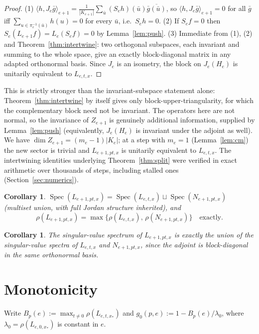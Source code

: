 \documentclass[11pt]{article}
\newtheorem{corollary}[theorem]{Corollary}
\theoremstyle{definition}
\theoremstyle{remark}
\newcommand{\Spec}{\operatorname{Spec}}
\begin{document}
\begin{proof}
(1) $\langle h,J_e\bar g\rangle_{e+1}=\frac{1}{|K_{e+1}|}\sum_{\bar u}(S_eh)(\bar u)\overline{\bar g(\bar u)}$, so $\langle h,J_e\bar g\rangle_{e+1}=0$ for all $\bar g$ iff $\sum_{u\in\pi_e^{-1}(\bar u)}h(u)=0$ for every $\bar u$, i.e.\ $S_eh=0$.
(2) If $S_ef=0$ then $S_e(L_{e+1}f)=L_e(S_ef)=0$ by Lemma~\ref{lem:push}.
(3) Immediate from (1), (2) and Theorem~\ref{thm:intertwine}: two orthogonal subspaces, each invariant and summing to the whole space, give an exactly block-diagonal matrix in any adapted orthonormal basis. Since $J_e$ is an isometry, the block on $J_e(H_e)$ is unitarily equivalent to $L_{e,t,x}$.
\end{proof}

This is strictly stronger than the invariant-subspace statement alone: Theorem~\ref{thm:intertwine} by itself gives only block-upper-triangularity, for which the complementary block need not be invariant. The operators here are not normal, so the invariance of $Z_{e+1}$ is genuinely additional information, supplied by Lemma~\ref{lem:push} (equivalently, $J_e(H_e)$ is invariant under the adjoint as well). We have $\dim Z_{e+1}=(m_e-1)|K_e|$; at a step with $m_e=1$ (Lemma~\ref{lem:cm}) the new sector is trivial and $L_{e+1,pt,x}$ is unitarily equivalent to $L_{e,t,x}$. The intertwining identities underlying Theorem~\ref{thm:split} were verified in exact arithmetic over thousands of steps, including stalled ones (Section~\ref{sec:numerics}).

\begin{corollary}\label{cor:spec}
$\Spec(L_{e+1,pt,x})=\Spec(L_{e,t,x})\sqcup\Spec(N_{e+1,pt,x})$ (multiset union, with full Jordan structure inherited), and
\[
\rho(L_{e+1,pt,x})=\max\big\{\rho(L_{e,t,x}),\,\rho(N_{e+1,pt,x})\big\}\quad\text{exactly}.
\]
\end{corollary}

\begin{corollary}\label{cor:sv}
The singular-value spectrum of $L_{e+1,pt,x}$ is exactly the union of the singular-value spectra of $L_{e,t,x}$ and $N_{e+1,pt,x}$, since the adjoint is block-diagonal in the same orthonormal basis.
\end{corollary}

\section{Monotonicity}

Write $B_p(e):=\max_{t\ne0}\rho(L_{e,t,x_*})$ and $g_0(p,e):=1-B_p(e)/\lambda_0$, where $\lambda_0=\rho(L_{e,0,x_*})$ is constant in $e$.
\end{document}
